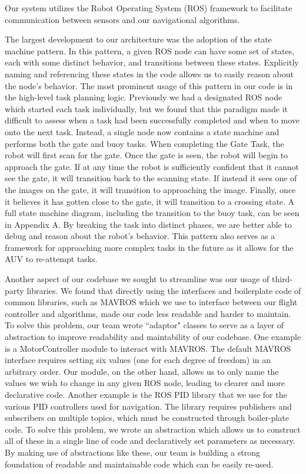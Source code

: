 \documentclass[conference]{IEEEtran}
\begin{document}
    Our system utilizes the Robot Operating System (ROS) framework to facilitate communication between sensors and our navigational algorithms. 

    The largest development to our architecture was the adoption of the state machine pattern. In this pattern, a given ROS node can have some set of states, each with some distinct behavior, and transitions between these states. Explicitly naming and referencing these states in the code allows us to easily reason about the node's behavior. The most prominent usage of this pattern in our code is in the high-level task planning logic. Previously we had a designated ROS node which started each task individually, but we found that this paradigm made it difficult to assess when a task had been successfully completed and when to move onto the next task. Instead, a single node now contains a state machine and performs both the gate and buoy tasks. When completing the Gate Task, the robot will first scan for the gate. Once the gate is seen, the robot will begin to approach the gate. If at any time the robot is sufficiently confident that it cannot see the gate, it will transition back to the scanning state. If instead it sees one of the images on the gate, it will transition to approaching the image. Finally, once it believes it has gotten close to the gate, it will transition to a crossing state. A full state machine diagram, including the transition to the buoy task, can be seen in Appendix A. By breaking the task into distinct phases, we are better able to debug and reason about the robot's behavior. This pattern also serves as a framework for approaching more complex tasks in the future as it allows for the AUV to re-attempt tasks. 
    
    Another aspect of our codebase we sought to streamline was our usage of third-party libraries. We found that directly using the interfaces and boilerplate code of common libraries, such as MAVROS which we use to interface between our flight controller and algorithms, made our code less readable and harder to maintain. To solve this problem, our team wrote ``adaptor" classes to serve as a layer of abstraction to improve readability and maintability of our codebase. One example is a MotorController module to interact with MAVROS. The default MAVROS interface requires setting six values (one for each degree of freedom) in an arbitrary order. Our module, on the other hand, allows us to only name the values we wish to change in any given ROS node, leading to clearer and more declarative code. Another example is the ROS PID library that we use for the various PID controllers used for navigation. The library requires publishers and subscribers on multiple topics, which must be constructed through boiler-plate code. To solve this problem, we wrote an abstraction which allows us to construct all of these in a single line of code and declaratively set parameters as necessary. By making use of abstractions like these, our team is building a strong foundation of readable and maintainable code which can be easily re-used. 
    
\end{document}
